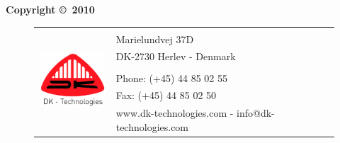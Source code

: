 \vfill	%
%
\noindent\textbf{Copyright \copyright\ 2010 \Firma}
\begin{figure}[b] \tiny\small
\begin{tabular}{ll}
\multirow{7}{*}{\includegraphics[width=80pt]{fig/dk_logo_centreret}}	& \Firma \\
& Marielundvej 37D				  \\ 
& DK-2730 Herlev - Denmark  \\
& 												  \\
& Phone:  (+45) 44 85 02 55 \\
& Fax:    (+45) 44 85 02 50 \\
& www.dk-technologies.com - info@dk-technologies.com\\
\end{tabular}
\end{figure}

\cleardoublepage
